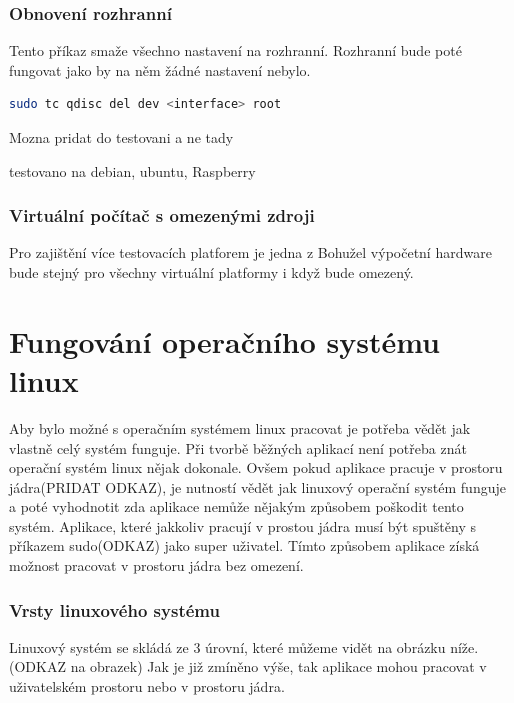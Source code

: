 \subsection*{Obnovení rozhranní}
Tento příkaz smaže všechno nastavení na rozhranní. Rozhranní bude poté fungovat jako by na něm žádné nastavení nebylo.
\begin{lstlisting}[language=bash]
    sudo tc qdisc del dev <interface> root
\end{lstlisting}


Mozna pridat do testovani a ne tady

testovano na debian, ubuntu, Raspberry

\subsection{Virtuální počítač s omezenými zdroji}

Pro zajištění více testovacích platforem je jedna z
Bohužel výpočetní hardware bude stejný pro všechny virtuální platformy i když bude omezený.

\chapter{Fungování operačního systému linux}

Aby bylo možné s operačním systémem linux pracovat je potřeba vědět jak vlastně celý systém funguje. Při tvorbě běžných aplikací není potřeba
znát operační systém linux nějak dokonale. Ovšem pokud aplikace pracuje v prostoru jádra(PRIDAT ODKAZ), je nutností vědět jak linuxový operační
systém funguje a poté vyhodnotit zda aplikace nemůže nějakým způsobem poškodit tento systém. Aplikace, které jakkoliv pracují v prostou
jádra musí být spuštěny s příkazem sudo(ODKAZ) jako super uživatel. Tímto způsobem aplikace získá možnost pracovat v prostoru jádra bez
omezení.

\subsection{Vrsty linuxového systému}

Linuxový systém se skládá ze 3 úrovní, které můžeme vidět na obrázku níže.(ODKAZ na obrazek)
Jak je již zmíněno výše, tak aplikace mohou pracovat v uživatelském prostoru nebo v prostoru jádra.

